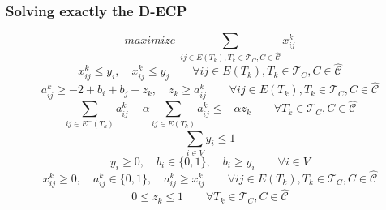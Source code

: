 \documentclass{beamer}
\begin{document}
\begin{frame}[c]
	\frametitle{Solving exactly the D-ECP}

	\begin{equation}
		maximize\; \sum_{ij \in E(T_{k}), T_{k} \in \mathcal{T}_{C}, C \in
			\mathcal{\hat{C}} } x_{ij} ^{k}
	\end{equation}
	\begin{equation}
		x _{ij}^{k}  \leq y_i, \quad x _{ij} ^{k} \leq y_j \quad\quad \forall ij \in E(T_{k}), T_{k} \in
		\mathcal{T}_{C}, C \in \mathcal{\hat{C}}
	\end{equation}
	\begin{equation}
		a _{ij} ^{k} \geq - 2 + b_i + b_j + z_k , \quad z_k \geq a_{ij}^{k}  \quad\quad \forall ij \in E(T_k), T_k \in \mathcal{T} _{C}, C \in \hat{\mathcal{C} }
	\end{equation}
	\begin{equation}
		\sum^{}_{ij \in E^{-} (T_k)} a_{ij}^{k}  - \alpha \sum^{}_{ij \in E(T_k)}
		a_{ij} ^{k}  \leq - \alpha z_k \quad\quad \forall T_{k} \in \mathcal{T} _{C}, C \in
		\hat{\mathcal{C}}
	\end{equation}
	\begin{equation}
		\sum^{}_{i \in V} y_i \leq 1
	\end{equation}
	\begin{equation}
		y _{i} \geq 0, \quad b _{i} \in \{0, 1\},
		\quad b_i \geq y_i\quad\quad \forall i \in V
	\end{equation}
	\begin{equation}
		x _{ij} ^{k}  \geq 0, \quad a _{ij} ^{k}  \in \{0, 1\}, \quad a_{ij}
			^{k} \geq x_{ij} ^{k}  \quad\quad \forall ij \in E(T_{k}), T_{k} \in
		\mathcal{T}_{C}, C \in \mathcal{\hat{C}}
	\end{equation}
	\begin{equation}
		0 \leq z _{k} \leq 1 \quad\quad \forall T_{k} \in \mathcal{T} _{C}, C \in
		\hat{\mathcal{C}}
	\end{equation}
\end{frame}
\end{document}
